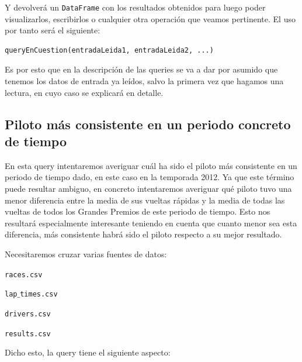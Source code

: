 \documentclass[12pt,twoside,titlepage]{report}
\begin{document}
Y devolverá un \texttt{DataFrame} con los resultados obtenidos para luego poder visualizarlos, escribirlos o cualquier otra operación que veamos pertinente. El uso por tanto será el siguiente:

\begin{lstlisting}
queryEnCuestion(entradaLeida1, entradaLeida2, ...)
\end{lstlisting}

Es por esto que en la descripción de las queries se va a dar por asumido que tenemos los datos de entrada ya leídos, salvo la primera vez que hagamos una lectura, en cuyo caso se explicará en detalle.

\subsection{Piloto más consistente en un periodo concreto de tiempo}

En esta query intentaremos averiguar cuál ha sido el piloto más consistente en un periodo de tiempo dado, en este caso en la temporada 2012. Ya que este término puede resultar ambiguo, en concreto intentaremos averiguar qué piloto tuvo una menor diferencia entre la media de sus vueltas rápidas y la media de todas las vueltas de todos los Grandes Premios de este periodo de tiempo. Esto nos resultará especialmente interesante teniendo en cuenta que cuanto menor sea esta diferencia, más consistente habrá sido el piloto respecto a su mejor resultado.

Necesitaremos cruzar varias fuentes de datos: 

\begin{compactitem}
	\item \texttt{races.csv}
	\item \texttt{lap$\_$times.csv}
	\item \texttt{drivers.csv}
	\item \texttt{results.csv}
\end{compactitem}

Dicho esto, la query tiene el siguiente aspecto:
\end{document}
